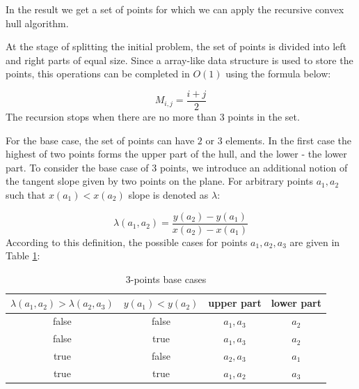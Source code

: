\documentclass[a4paper,UKenglish,cleveref, autoref]{socg-lipics-v2019}
\begin{document}
	In the result we get a set of points for which we can apply the recursive convex hull algorithm.
	
	
	
	At the stage of splitting the initial problem, the set of points is divided into left and right parts of equal size. Since a array-like data structure is used to store the points, this operations can be completed in $O(1)$ using the formula below:
	
	\begin{equation}
		M_{i,j}=\frac{i+j}{2}
	\end{equation}
	The recursion stops when there are no more than $3$ points in the set.
	
	For the base case, the set of points can have $2$ or $3$ elements. In the first case the highest of two points forms the upper part of the hull, and the lower - the lower part. To consider the base case of $3$ points, we introduce an additional notion of the tangent slope given by two points on the plane. For arbitrary points $a_1, a_2$ such that $x(a_1)<x(a_2)$ slope is denoted as $\lambda$:
	
	\begin{equation}
	\lambda(a_1, a_2)=\frac{y(a_2)-y(a_1)}{x(a_2)-x(a_1)}
	\end{equation}
	According to this definition, the possible cases for points $a_1,a_2,a_3$ are given in Table \ref{table:3points}:
	
	\begin{table}[htbp]
	\caption{3-points base cases}
	\label{table:3points}
	\begin{center}
		\begin{tabular}{|c|c|c|c|}
			\hline
			\textbf{$\lambda(a_1, a_2) > \lambda(a_2, a_3)$} & \textbf{$y(a_1) < y(a_2)$} & upper part & lower part\\
			\hline
			false & false & $a_1, a_3$ & $a_2$ \\
			\hline
			false & true & $a_1, a_3$ & $a_2$ \\
			\hline
			true & false & $a_2, a_3$ & $a_1$ \\
			\hline
			true & true & $a_1, a_2$ & $a_3$ \\
			\hline
		\end{tabular} 
	\end{center}
	\end{table} 
\end{document}
